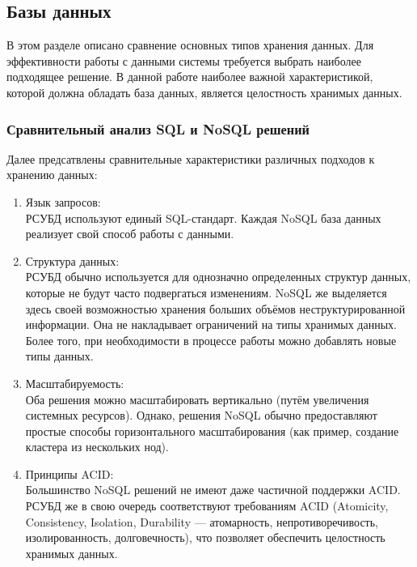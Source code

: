 \documentclass[a4paper,14pt]{extreport} %
\begin{document}
\subsection{Базы данных}

В этом разделе описано сравнение основных типов хранения данных. Для эффективности работы с данными системы требуется выбрать наиболее подходящее решение. В данной работе наиболее важной характеристикой, которой должна обладать база данных, является целостность хранимых данных.

\subsubsection{Сравнительный анализ SQL и NoSQL решений}

Далее предсатвлены сравнительные характеристики различных подходов к хранению данных\cite{DATABASE_COMPARISON}:
\begin{enumerate}
	\item Язык запросов: \\ РСУБД используют единый SQL-стандарт. Каждая NoSQL база данных реализует свой способ работы с данными.
	\item Структура данных: \\ РСУБД обычно используется для однозначно определенных структур данных, которые не будут часто подвергаться изменениям. NoSQL же выделяется здесь своей возможностью хранения больших объёмов неструктурированной информации. Она не накладывает ограничений на типы хранимых данных. Более того, при необходимости в процессе работы можно добавлять новые типы данных.
	\item Масштабируемость: \\ Оба решения можно масштабировать вертикально (путём увеличения системных ресурсов). Однако, решения NoSQL обычно предоставляют простые способы горизонтального масштабирования (как пример, создание кластера из нескольких нод).
	\item Принципы ACID: \\ Большинство NoSQL решений не имеют даже частичной поддержки ACID. РСУБД же в свою очередь соответствуют требованиям ACID (Atomicity, Consistency, Isolation, Durability — атомарность, непротиворечивость, изолированность, долговечность), что позволяет обеспечить целостность хранимых данных. 
\end{enumerate}
\end{document}
